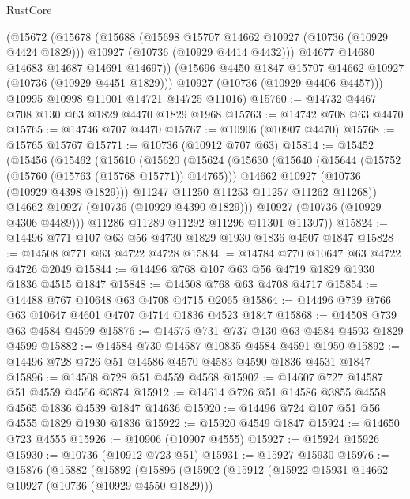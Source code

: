 \begin{lexlean}{RustCore}
\begin{coremodule}
        (@15672
          (@15678
            (@15688
              (@15698 @15707 @14662 @10927 (@10736 (@10929 @4424 @1829)))
              @10927
              (@10736 (@10929 @4414 @4432)))
            @14677
            @14680
            @14683
            @14687
            @14691
            @14697))
        (@15696 @4450 @1847 @15707 @14662 @10927 (@10736 (@10929 @4451 @1829)))
        @10927
        (@10736 (@10929 @4406 @4457)))
      @10995
      @10998
      @11001
      @14721
      @14725
      @11016)
@15760 := @14732 @4467 @708 @130 @63 @1829 @4470 @1829 @1968
@15763 := @14742 @708 @63 @4470
@15765 := @14746 @707 @4470
@15767 := @10906 (@10907 @4470)
@15768 := @15765 @15767
@15771 := @10736 (@10912 @707 @63)
@15814 := @15452
    (@15456
      (@15462
        (@15610
          (@15620
            (@15624
              (@15630
                (@15640
                  (@15644 (@15752 (@15760 (@15763 (@15768 @15771)) @14765)))
                  @14662
                  @10927
                  (@10736 (@10929 @4398 @1829)))
                @11247
                @11250
                @11253
                @11257
                @11262
                @11268))
            @14662
            @10927
            (@10736 (@10929 @4390 @1829)))
          @10927
          (@10736 (@10929 @4306 @4489)))
        @11286
        @11289
        @11292
        @11296
        @11301
        @11307))
@15824 := @14496 @771 @107 @63 @56 @4730 @1829 @1930 @1836 @4507 @1847
@15828 := @14508 @771 @63 @4722 @4728
@15834 := @14784 @770 @10647 @63 @4722 @4726 @2049
@15844 := @14496 @768 @107 @63 @56 @4719 @1829 @1930 @1836 @4515 @1847
@15848 := @14508 @768 @63 @4708 @4717
@15854 := @14488 @767 @10648 @63 @4708 @4715 @2065
@15864 := @14496 @739 @766 @63 @10647 @4601 @4707 @4714 @1836 @4523 @1847
@15868 := @14508 @739 @63 @4584 @4599
@15876 := @14575 @731 @737 @130 @63 @4584 @4593 @1829 @4599
@15882 := @14584 @730 @14587 @10835 @4584 @4591 @1950
@15892 := @14496 @728 @726 @51 @14586 @4570 @4583 @4590 @1836 @4531 @1847
@15896 := @14508 @728 @51 @4559 @4568
@15902 := @14607 @727 @14587 @51 @4559 @4566 @3874
@15912 := @14614 @726 @51 @14586 @3855 @4558 @4565 @1836 @4539 @1847 @14636
@15920 := @14496 @724 @107 @51 @56 @4555 @1829 @1930 @1836
@15922 := @15920 @4549 @1847
@15924 := @14650 @723 @4555
@15926 := @10906 (@10907 @4555)
@15927 := @15924 @15926
@15930 := @10736 (@10912 @723 @51)
@15931 := @15927 @15930
@15976 := @15876
    (@15882
      (@15892
        (@15896
          (@15902
            (@15912
              (@15922 @15931 @14662 @10927 (@10736 (@10929 @4550 @1829)))

\end{coremodule}
\end{lexlean}

